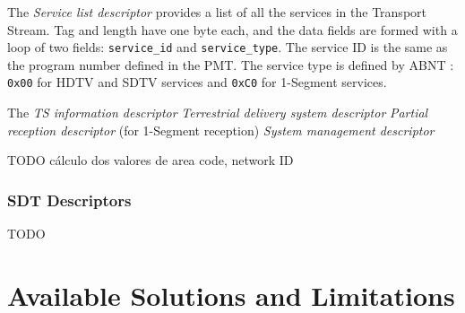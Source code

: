 \documentclass[
	12pt,				%
	openright,			%
	twoside,			%
	a4paper,			%
	brazil,
	french,				%
	english
	]{abntex2}
\begin{document}
The \textit{Service list descriptor} provides a list of all the services in the Transport Stream. Tag and length have one byte each, and the data fields are formed with a loop of two fields: \texttt{service\_id} and \texttt{service\_type}. The service ID is the same as the program number defined in the PMT. The service type is defined by ABNT : \texttt{0x00} for HDTV and SDTV services and \texttt{0xC0} for 1-Segment services.

The \textit{TS information descriptor}
\textit{Terrestrial delivery system descriptor}
\textit{Partial reception descriptor} (for 1-Segment reception)
\textit{System management descriptor}

TODO cálculo dos valores de area code, network ID

\subsection{SDT Descriptors}
\label{nit_descriptors}
TODO




\chapter{Available Solutions and Limitations}
\end{document}
